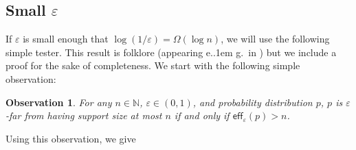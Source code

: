 \documentclass[10pt,a4paper]{article}
\newtheorem{observation}{Observation}[section]
\newcommand*\eg{e.\kern.1em g.\ }
\newcommand{\bN}{\ensuremath{\mathbb{N}}}
\newcommand{\eff}{\mathsf{eff}}
\renewcommand{\epsilon}{\varepsilon}
\begin{document}
\subsection{Small \texorpdfstring{$\epsilon$}{epsilon}}
\label{section:small-epsilon}

If $\epsilon$ is small enough that $\log(1/\epsilon) = \Omega(\log n)$, we will use the following
simple tester. This result is folklore (appearing \eg in \cite{GR23,AF24,AFL24}) but we include a
proof for the sake of completeness. We start with the following simple observation:
\begin{observation}
    \label{obs:eff}
    For any $n \in \bN$, $\epsilon \in (0,1)$, and probability distribution $p$, $p$ is
    $\epsilon$-far from having support size at most $n$ if and only if $\eff_\epsilon(p) > n$.
\end{observation}

\noindent
Using this observation, we give
\end{document}
